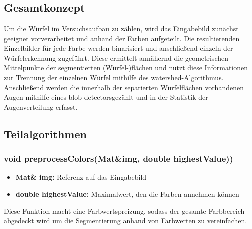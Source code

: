\documentclass{../Vorlage/sebDenCls}
\begin{document}

\section{}
\subsection{Gesamtkonzept}
Um die Würfel im Versuchsaufbau zu zählen, wird das Eingabebild zunächst geeignet vorverarbeitet und anhand der Farben aufgeteilt. Die resultierenden Einzelbilder für jede Farbe werden binarisiert und anschließend einzeln der Würfelerkennung zugeführt. Diese ermittelt annähernd die geometrischen Mittelpunkte der segmentierten (Würfel-)flächen und nutzt diese Informationen zur Trennung der einzelnen Würfel mithilfe des \glqq watershed\grqq-Algorithmus. Anschließend werden die innerhalb der separierten Würfelflächen vorhandenen Augen mithilfe eines \glqq blob detectors\grqq  gezählt und in der Statistik der Augenverteilung erfasst.

\subsection{Teilalgorithmen}

\subsubsection{void preprocessColors(Mat\&img, double highestValue))}
\begin{itemize}
	\item \textbf{Mat\& img:} Referenz auf das Eingabebild
	\item \textbf{double highestValue:} Maximalwert, den die Farben annehmen können
\end{itemize}
Diese Funktion macht eine Farbwertspreizung, sodass der gesamte Farbbereich abgedeckt wird um die Segmentierung anhand von Farbwerten zu vereinfachen.
\end{document}
